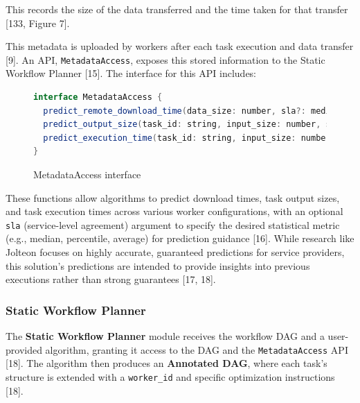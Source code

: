 \documentclass[conference]{IEEEtran}
\begin{document}
This records the size of the data transferred and the time taken for that transfer [133, Figure 7].

This metadata is uploaded by workers after each task execution and data transfer [9]. An API, \texttt{MetadataAccess}, exposes this stored information to the Static Workflow Planner [15]. The interface for this API includes:
\begin{figure}[h]
\centering
\begin{lstlisting}[language=Java, basicstyle=\ttfamily\footnotesize, columns=fullflexible, breaklines=true]
interface MetadataAccess {
  predict_remote_download_time(data_size: number, sla?: median | percentile_value | avg): number;
  predict_output_size(task_id: string, input_size: number, sla?: median | percentile_value | avg): number;
  predict_execution_time(task_id: string, input_size: number, worker_configs: List <{ worker_config: { v_cpu: number, ram: number } }>, sla?: median | percentile_value | avg): List <{ worker_config: { v_cpu: number, ram: number }, time: number }>;
}
\end{lstlisting}
\caption{MetadataAccess interface}
\label{lst:metadata_access}
\end{figure}

These functions allow algorithms to predict download times, task output sizes, and task execution times across various worker configurations, with an optional \texttt{sla} (service-level agreement) argument to specify the desired statistical metric (e.g., median, percentile, average) for prediction guidance [16]. While research like Jolteon focuses on highly accurate, guaranteed predictions for service providers, this solution's predictions are intended to provide insights into previous executions rather than strong guarantees [17, 18].

\subsubsection{Static Workflow Planner}
The \textbf{Static Workflow Planner} module receives the workflow DAG and a user-provided algorithm, granting it access to the DAG and the \texttt{MetadataAccess} API [18]. The algorithm then produces an \textbf{Annotated DAG}, where each task's structure is extended with a \texttt{worker\_id} and specific optimization instructions [18].
\end{document}

